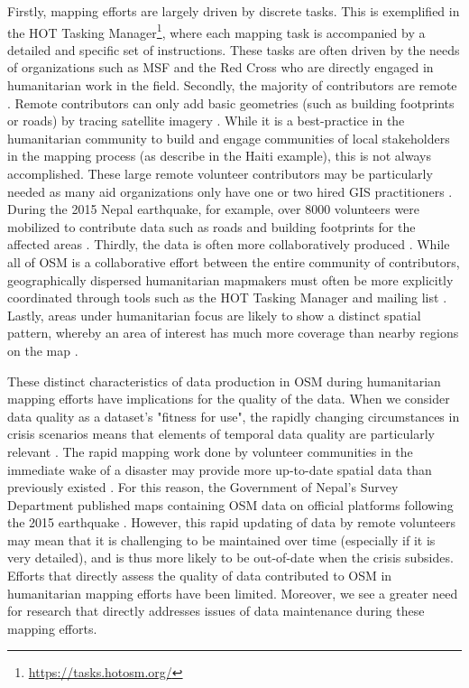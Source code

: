Firstly, mapping efforts are largely driven by discrete tasks. This is exemplified in the HOT Tasking Manager\footnote{\url{https://tasks.hotosm.org/}}, where each mapping task is accompanied by a detailed and specific set of instructions. These tasks are often driven by the needs of organizations such as MSF and the Red Cross who are directly engaged in humanitarian work in the field. Secondly, the majority of contributors are remote \parencite{eckle_quality_2015}. Remote contributors can only add basic geometries (such as building footprints or roads) by tracing satellite imagery \parencite{vyncke_humanitarian_2015}. While it is a best-practice in the humanitarian community to build and engage communities of local stakeholders in the mapping process (as \textcite{soden_crowdsourced_2014} describe in the Haiti example), this is not always accomplished. These large remote volunteer contributors may be particularly needed as many aid organizations only have one or two hired GIS practitioners \textcite[p. 2798]{soden_infrastructure_2016}. During the 2015 Nepal earthquake, for example, over 8000 volunteers were mobilized to contribute data such as roads and building footprints for the affected areas \textcite{soden_infrastructure_2016}. Thirdly, the data is often more collaboratively produced \parencite{poiani_potential_2016}. While all of OSM is a collaborative effort between the entire community of contributors, geographically dispersed humanitarian mapmakers must often be more explicitly coordinated through tools such as the HOT Tasking Manager and mailing list \parencite{palen_success_2015}. Lastly, areas under humanitarian focus are likely to show a distinct spatial pattern, whereby an area of interest has much more coverage than nearby regions on the map \parencite{anderson_crowd_2018}. 

These distinct characteristics of data production in OSM during humanitarian mapping efforts have implications for the quality of the data. When we consider data quality as a dataset’s "fitness for use", the rapidly changing circumstances in crisis scenarios means that elements of temporal data quality are particularly relevant \parencite{chen_coordination_2008}. The rapid mapping work done by volunteer communities in the immediate wake of a disaster may provide more up-to-date spatial data than previously existed \parencite{soden_crowdsourced_2014}. For this reason, the Government of Nepal’s Survey Department published maps containing OSM data on official platforms following the 2015 earthquake \parencite{soden_infrastructure_2016}. However, this rapid updating of data by remote volunteers may mean that it is challenging to be maintained over time (especially if it is very detailed), and is thus more likely to be out-of-date when the crisis subsides. Efforts that directly assess the quality of data contributed to OSM in humanitarian mapping efforts have been limited. Moreover, we see a greater need for research that directly addresses issues of data maintenance during these mapping efforts. 

